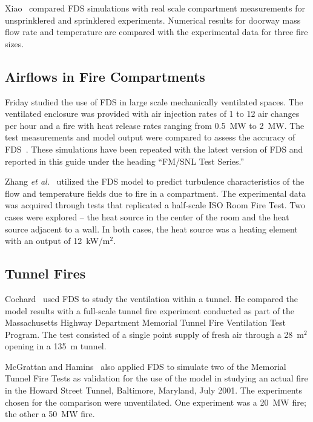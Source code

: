 Xiao~\cite{Xiao:FT2012} compared FDS simulations with real scale compartment measurements for unsprinklered and sprinklered experiments. Numerical results for doorway mass flow rate and temperature are compared with the experimental data for three fire sizes.



\subsection{Airflows in Fire Compartments}

Friday studied the use of FDS in large scale mechanically ventilated spaces.  The ventilated enclosure was provided with air injection rates of 1 to 12 air changes per hour and a fire with heat release rates ranging from 0.5~MW to 2~MW. The test measurements and model output were compared to assess the accuracy of FDS~\cite{Friday:1}. These simulations have been repeated with the latest version of FDS and reported in this guide under
the heading ``FM/SNL Test Series.''

Zhang {\em et al.}~\cite{Zhang:2} utilized the FDS model to predict turbulence characteristics of the flow and temperature fields due to fire in a compartment.  The experimental data was acquired through tests that replicated a half-scale ISO Room Fire Test. Two cases were explored -- the heat source in the center of the room and the heat source adjacent to a wall. In both cases, the heat source was a heating element with an output of 12~kW/m$^2$.


\subsection{Tunnel Fires}

Cochard~\cite{Cochard:1} used FDS to study the ventilation within a tunnel. He compared the model results with a full-scale tunnel fire experiment conducted as part of the Massachusetts Highway Department Memorial Tunnel Fire Ventilation Test Program. The test consisted of a single point supply of fresh air through a 28~m$^2$ opening in a 135~m tunnel.

McGrattan and Hamins~\cite{McGrattan:HST} also applied FDS to simulate two of the Memorial Tunnel Fire Tests as validation for the use of the model in studying an actual fire in the Howard Street Tunnel, Baltimore, Maryland, July 2001. The experiments chosen for the comparison were unventilated. One experiment was a 20~MW fire; the other a 50~MW fire.

